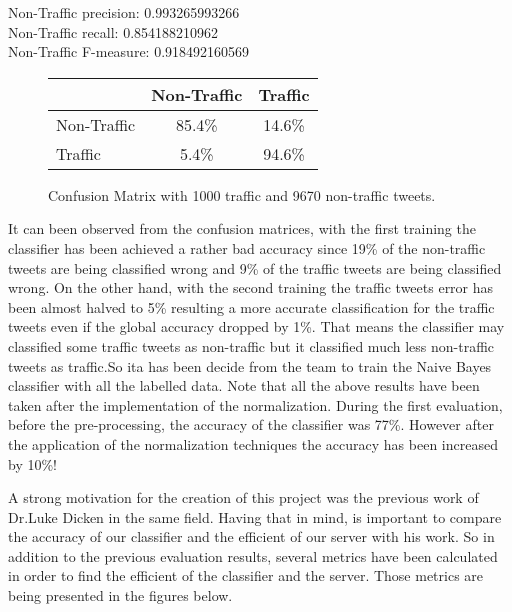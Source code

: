Non-Traffic precision:\hspace{7.2 mm}         0.993265993266\\
Non-Traffic recall:\hspace{13 mm}           0.854188210962\\
Non-Traffic F-measure:\hspace{4.6 mm}         0.918492160569\\

\begin{figure}[h!]
\begin{center}
    \begin{tabular}{| l || c | c | }
    \hline
          & Non-Traffic & Traffic \\ \hline \hline
        Non-Traffic & 85.4\% & 14.6\% \\ \hline
        Traffic & 5.4\% & 94.6\% \\ \hline
    \end{tabular}
    \caption{Confusion Matrix with 1000 traffic and 9670 non-traffic tweets.}
    \label{fig:confusionMatrix1}
\end{center}
\end{figure}
	
It can been observed from the confusion matrices, with the first training the classifier has been achieved a rather bad accuracy since 19\% of the non-traffic tweets are being classified wrong and 9\% of the traffic tweets are being classified wrong. On the other hand, with the second training the traffic tweets error has been almost halved to 5\% resulting a more accurate classification for the traffic tweets even if the global accuracy dropped by 1\%. That means the classifier may classified some traffic tweets as non-traffic but it classified much less non-traffic tweets as traffic.So ita has been decide from the team to train the Naive Bayes classifier with all the labelled data. Note that all the above results have been taken after the implementation of the normalization. During the first evaluation, before the pre-processing, the accuracy of the classifier was 77\%. However after the application of the normalization techniques the accuracy has been increased by 10\%!

A strong motivation for the creation of this project was the previous work of Dr.Luke Dicken in the same field. Having that in mind, is important to compare the accuracy of our classifier and the efficient of our server with his work. So in addition to the previous evaluation results, several metrics have been calculated in order to find the efficient of the classifier and the server. Those metrics are being presented in the figures below.


